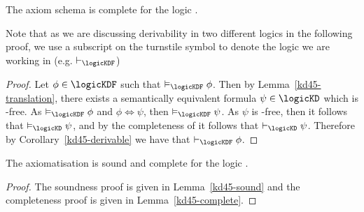 \begin{lemma}\label{kd45-complete}
The axiom schema \axiomKDF{} is complete for the logic \logicKDF{}.
\end{lemma}

Note that as we are discussing derivability in two different logics in the
following proof, we use a subscript on the turnstile symbol to denote the logic
we are working in (e.g. $\proves_{\logicKDF}$)

\begin{proof}
Let $\phi \in \logicKDF$ such that $\entails_{\logicKDF} \phi$. Then by
Lemma~\ref{kd45-translation}, there exists a semantically equivalent formula
$\psi \in \logicKD$ which is \somerefs-free. As $\entails_{\logicKDF} \phi$ and
$\phi \iff \psi$, then $\entails_{\logicKDF} \psi$. As $\psi$ is
\somerefs-free, then it follows that $\entails_{\logicKD} \psi$, and by the
completeness of \axiomKDF{} it follows that $\proves_{\logicKD} \psi$.
Therefore by Corollary~\ref{kd45-derivable} we have that $\proves_{\logicKDF}
\phi$.
\end{proof}

\begin{theorem}
The axiomatisation \axiomKDF{} is sound and complete for the logic \logicKDF{}.
\end{theorem}

\begin{proof}
The soundness proof is given in Lemma~\ref{kd45-sound} and the completeness
proof is given in Lemma~\ref{kd45-complete}.
\end{proof}
